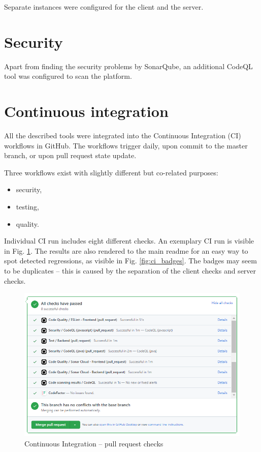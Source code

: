 \documentclass[a4paper,twoside,12pt]{book}
\begin{document}
Separate instances were configured for the client and the server.
 
\section{Security}

Apart from finding the security problems by SonarQube, an additional CodeQL tool was configured to scan the platform.

\section{Continuous integration}

All the described tools were integrated into the Continuous Integration (CI) workflows in GitHub. The workflows trigger daily, upon commit to the master branch, or upon pull request state update.

Three workflows exist with slightly different but co-related purposes:
\begin{itemize}
\item security,
\item testing,
\item quality.
\end{itemize}

Individual CI run includes eight different checks. An exemplary CI run is visible in Fig. \ref{fig:ci_checks}. The results are also rendered to the main readme for an easy way to spot detected regressions, as visible in Fig. \ref{fig:ci_badges}. The badges may seem to be duplicates -- this is caused by the separation of the client checks and server checks.

\begin{figure}
  \centering
  \includegraphics[width=0.75\linewidth]{img/ci_checks.png}
  \caption{Continuous Integration – pull request checks}
  \label{fig:ci_checks}
\end{figure}
\end{document}
